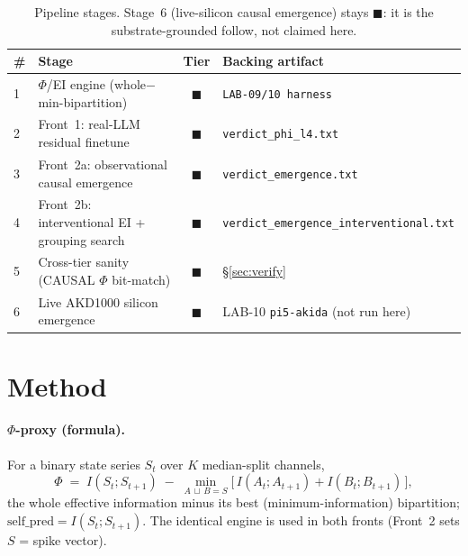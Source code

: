 \documentclass[11pt,a4paper]{article}
\providecommand{\tierBlue}{{\color{blue!60!black}$\blacksquare$}}
\providecommand{\tierGreen}{{\color{green!50!black}$\blacksquare$}}
\providecommand{\tierOrange}{{\color{orange}$\blacksquare$}}
\begin{document}
\medskip
\begin{table}[h]
\centering
\small
\begin{tabular}{@{}>{\centering\arraybackslash}m{0.4cm} >{\raggedright\arraybackslash}m{4.6cm} c >{\raggedright\arraybackslash}m{6cm}@{}}
\toprule
\textbf{\#} & \textbf{Stage} & \textbf{Tier} & \textbf{Backing artifact} \\
\midrule
\textcircled{\scriptsize 1} & $\Phi$/EI engine (whole$-$min-bipartition)        & \tierBlue   & \texttt{LAB-09/10 harness} \\
\textcircled{\scriptsize 2} & Front~1: real-LLM residual finetune                & \tierGreen  & \texttt{verdict\_phi\_l4.txt} \\
\textcircled{\scriptsize 3} & Front~2a: observational causal emergence           & \tierGreen  & \texttt{verdict\_emergence.txt} \\
\textcircled{\scriptsize 4} & Front~2b: interventional EI + grouping search      & \tierGreen  & \texttt{verdict\_emergence\_interventional.txt} \\
\textcircled{\scriptsize 5} & Cross-tier sanity (CAUSAL $\Phi$ bit-match)        & \tierGreen  & \S\ref{sec:verify} \\
\textcircled{\scriptsize 6} & Live AKD1000 silicon emergence                     & \tierOrange & LAB-10 \texttt{pi5-akida} (not run here) \\
\bottomrule
\end{tabular}
\caption{Pipeline stages. Stage~6 (live-silicon causal emergence) stays
\tierOrange: it is the substrate-grounded follow, not claimed here.}
\label{tab:pipeline}
\end{table}

\section{Method}
\label{sec:method}

\paragraph{$\Phi$-proxy (formula).} For a binary state series $S_t$ over $K$
median-split channels,
\[
  \Phi \;=\; I(S_t;S_{t+1}) \;-\; \min_{A\,\sqcup\,B = S}\big[\,I(A_t;A_{t+1}) + I(B_t;B_{t+1})\,\big],
\]
the whole effective information minus its best (minimum-information) bipartition;
$\mathrm{self\_pred}=I(S_t;S_{t+1})$. The identical engine is used in both
fronts (Front~2 sets $S$ = spike vector).
\end{document}
